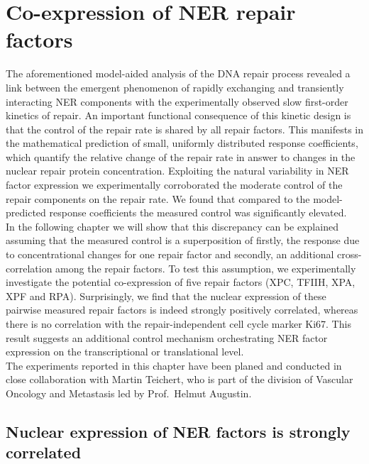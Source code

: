 \chapter{Co-expression of NER repair factors}
The aforementioned model-aided analysis of the DNA repair process revealed a link between the emergent phenomenon of rapidly exchanging and transiently interacting NER components with the experimentally observed slow first-order kinetics of repair. An important functional consequence of this kinetic design is that the control of the repair rate is shared by all repair factors. This manifests in the mathematical prediction of small, uniformly distributed response coefficients, which quantify the relative change of the repair rate in answer to changes in the nuclear repair protein concentration. Exploiting the natural variability in NER factor expression we experimentally corroborated the moderate control of the repair components on the repair rate. We found that compared to the model-predicted response coefficients the measured control was significantly elevated. \\ 
In the following chapter we will show that this discrepancy can be explained assuming that the measured control is a superposition of firstly, the response due to concentrational changes for one repair factor and secondly, an additional cross-correlation among the repair factors. To test this assumption, we experimentally investigate the potential co-expression of five repair factors (XPC, TFIIH, XPA, XPF and RPA). Surprisingly, we find that the nuclear expression of these pairwise measured repair factors is indeed strongly positively correlated, whereas there is no correlation with the repair-independent cell cycle marker Ki67. This result suggests an additional control mechanism orchestrating NER factor expression on the transcriptional or translational level.\\ 

The experiments reported in this chapter have been planed and conducted in close collaboration with Martin Teichert, who is part of the division of Vascular Oncology and Metastasis led by Prof.\ Helmut Augustin. 
 

\section{Nuclear expression of NER factors is strongly correlated}

